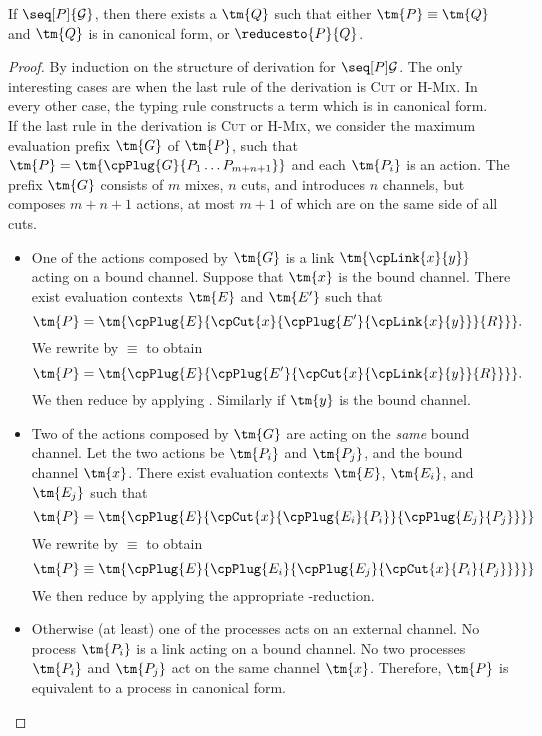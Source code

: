\begin{theorem}[Progress]\label{thm:hcp-progress}
  If $\seq[P]{\mathcal{G}}$, then there exists a $\tm{Q}$ such that either
  $\tm{P}\equiv\tm{Q}$ and $\tm{Q}$ is in canonical form, or $\reducesto{P}{Q}$.
\end{theorem}
\begin{proof}
  By induction on the structure of derivation for $\seq[{ P }]{ \mathcal{G} }$.
  The only interesting cases are when the last rule of the derivation is
  \textsc{Cut} or \textsc{H-Mix}. In every other case, the typing rule
  constructs a term which is in canonical form. 
  \\
  If the last rule in the derivation is \textsc{Cut} or \textsc{H-Mix}, we
  consider the maximum evaluation prefix $\tm{G}$ of $\tm{P}$, such that $\tm{P}
  = \tm{\cpPlug{G}{P_1 \dots P_{m+n+1}}}$ and each $\tm{P_i}$ is an action.
  The prefix $\tm{G}$ consists of $m$ mixes, $n$ cuts, and introduces $n$
  channels, but composes $m+n+1$ actions, at most $m+1$ of which are on the same
  side of all cuts.
  \begin{itemize}
  \item
    One of the actions composed by $\tm{G}$ is a link $\tm{\cpLink{x}{y}}$
    acting on a bound channel.
    Suppose that $\tm{x}$ is the bound channel.
    There exist evaluation contexts $\tm{E}$ and $\tm{E'}$ such that
    \[
      \tm{P} =
      \tm{\cpPlug{E}{\cpCut{x}{\cpPlug{E'}{\cpLink{x}{y}}}{R}}}.
    \]
    We rewrite by $\equiv$ to obtain
    \[
      \tm{P} =
      \tm{\cpPlug{E}{\cpPlug{E'}{\cpCut{x}{\cpLink{x}{y}}{R}}}}.
    \]
    We then reduce by applying .
    Similarly if $\tm{y}$ is the bound channel.
  \item
    Two of the actions composed by $\tm{G}$ are acting on the \emph{same} bound
    channel.
    Let the two actions be $\tm{P_i}$ and $\tm{P_j}$, and the bound channel
    $\tm{x}$.
    There exist evaluation contexts $\tm{E}$, $\tm{E_i}$, and $\tm{E_j}$ such
    that
    \[
      \tm{P} =
      \tm{\cpPlug{E}{\cpCut{x}{\cpPlug{E_i}{P_i}}{\cpPlug{E_j}{P_j}}}}
    \]
    We rewrite by $\equiv$ to obtain
    \[
      \tm{P} \equiv
      \tm{\cpPlug{E}{\cpPlug{E_i}{\cpPlug{E_j}{\cpCut{x}{P_i}{P_j}}}}}
    \]
    We then reduce by applying the appropriate \textbeta-reduction.
  \item
    Otherwise (at least) one of the processes acts on an external channel.
    No process $\tm{P_i}$ is a link acting on a bound channel.
    No two processes $\tm{P_i}$ and $\tm{P_j}$ act on the same channel $\tm{x}$.
    Therefore, $\tm{P}$ is equivalent to a process in canonical form.
  \end{itemize}
\end{proof}

